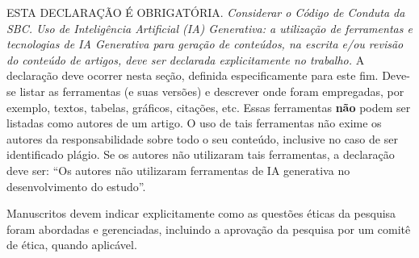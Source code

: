 \documentclass[portuguese]{sbcreviews-2025}%
\begin{document}
\begin{declarations}
\begin{aitools}
ESTA DECLARAÇÃO É OBRIGATÓRIA.  
\textit{Considerar o Código de Conduta da SBC.
Uso de Inteligência Artificial (IA) Generativa: 
a utilização de ferramentas e tecnologias de IA Generativa para geração de conteúdos, 
na escrita e/ou revisão do conteúdo de artigos, deve ser declarada explicitamente no trabalho.} 
A declaração deve ocorrer nesta seção, definida especificamente para este fim.
Deve-se listar as ferramentas (e suas versões) e descrever onde foram empregadas, por exemplo, 
textos, tabelas, gráficos, citações, etc. 
Essas ferramentas \textbf{não} podem ser listadas como autores de um artigo. 
O uso de tais ferramentas não exime os autores da responsabilidade 
sobre todo o seu conteúdo, inclusive no caso de ser identificado plágio.
%
Se os autores não utilizaram tais ferramentas, a declaração deve ser: 
``Os autores não utilizaram ferramentas de IA generativa no desenvolvimento do estudo''.
%
\end{aitools}

\begin{furtherinformation}
Manuscritos devem indicar explicitamente como as questões éticas da pesquisa foram abordadas e gerenciadas, 
incluindo a aprovação da pesquisa por um comitê de ética, quando aplicável.
\end{furtherinformation}

\end{declarations}



\end{document}

